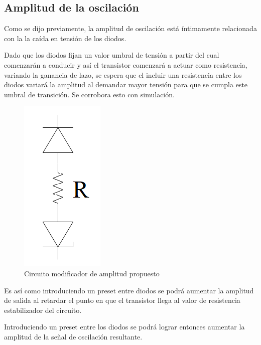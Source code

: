 \documentclass[../../tc_tp6_main.tex]{subfiles}
\begin{document}
\subsection{Amplitud de la oscilación}
Como se dijo previamente, la amplitud de oscilación está íntimamente relacionada con la la caída en tensión de los diodos.\par
Dado que los diodos fijan un valor umbral de tensión a partir del cual comenzarán a conducir y así el transistor comenzará a actuar como resistencia, variando la ganancia de lazo, se espera que el incluir una resistencia entre los diodos variará la amplitud al demandar mayor tensión para que se cumpla este umbral de transición. Se corrobora esto con simulación. \par
\begin{figure}[H]	
	\centering
	\includegraphics[scale=0.5]{imagenes/resistencia_diodos.png}
	\caption{Circuito modificador de amplitud propuesto}
	\label{fig:ej1_resistencia_diodos}
\end{figure}
Es así como introduciendo un preset entre diodos se podrá aumentar la amplitud de salida al retardar el punto en que el transistor llega al valor de resistencia estabilizador del circuito.\par
Introduciendo un preset entre los diodos se podrá lograr entonces aumentar la amplitud de la señal de oscilación resultante.\par
\end{document}
